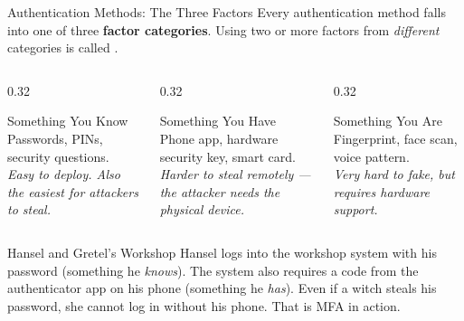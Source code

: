 \documentclass[aspectratio=169]{beamer}  %
\begin{document}
\begin{frame}{Authentication Methods: The Three Factors}
    \footnotesize
    Every authentication method falls into one of three \textbf{factor categories}.
    Using two or more factors from \emph{different} categories is called .

    \vspace{0.4em}
    \begin{columns}[T]
        \begin{column}{0.32\textwidth}
            \begin{block}{Something You Know}
                \footnotesize
                Passwords, PINs, security questions.\\[0.4em]
                \textit{Easy to deploy. Also the easiest for attackers to steal.}
            \end{block}
        \end{column}
        \begin{column}{0.32\textwidth}
            \begin{block}{Something You Have}
                \footnotesize
                Phone app, hardware security key, smart card.\\[0.4em]
                \textit{Harder to steal remotely --- the attacker needs the physical device.}
            \end{block}
        \end{column}
        \begin{column}{0.32\textwidth}
            \begin{block}{Something You Are}
                \footnotesize
                Fingerprint, face scan, voice pattern.\\[0.4em]
                \textit{Very hard to fake, but requires hardware support.}
            \end{block}
        \end{column}
    \end{columns}

    \vspace{0.5em}
    \begin{exampleblock}{Hansel and Gretel's Workshop}
        \footnotesize
        Hansel logs into the workshop system with his password (something he \emph{knows}). The system also requires a code from the authenticator app on his phone (something he \emph{has}). Even if a witch steals his password, she cannot log in without his phone. That is MFA in action.
    \end{exampleblock}
\end{frame}
\end{document}
